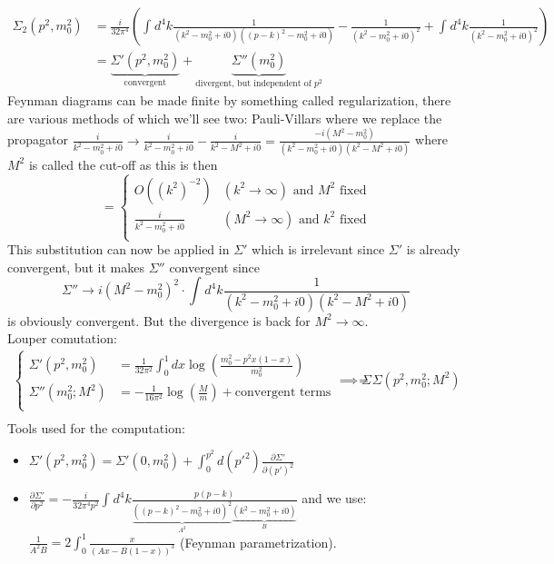 \documentclass{report}
\begin{document}
\begin{align*}
  \Sigma_2\left( p^2, m_0^2 \right) &= \frac{i}{32 \pi^{4}  } \left( \int_{}^{} d^{4}k \frac{1}{\left( k^2 - m_0^2 + i 0 \right) \left( \left( p-k \right) ^2 - m_0^2 + i 0 \right) } - \frac{1}{\left( k^2 - m_0^2 + i 0 \right)^2}   + \int_{}^{} d^{4}k \frac{1}{\left( k^2 - m_0^2 + i 0 \right) ^2} \right) \\
       &= \underbrace{ \Sigma'\left( p^2, m_0^2 \right) }_{\text{convergent}}  + \underbrace{\Sigma''\left( m_0^2 \right)}_{\text{divergent, but independent of } p^2} 
\end{align*}
Feynman diagrams can be made finite by something called regularization, there are various methods of which we'll see two: Pauli-Villars where we replace the propagator $\frac{i}{k^2 - m_0^2 + i 0} \to \frac{i}{k^2 - m_0^2 + i 0} - \frac{i}{k^2 - M^2 + i 0} = \frac{-i \left( M^2 - m_0^2 \right) }{\left( k^2 - m_0^2 + i 0  \right) \left( k^2 - M^2 + i 0 \right) } $ where $M^2$ is called the cut-off as this is then \[
= \begin{cases}
  O\left( \left( k^2 \right)^{-2}  \right)  & \left( k^2 \to \infty \right) \text{ and $M^2$ fixed} \\
  \frac{i}{k^2 - m_0^2 + i 0}  & \left( M^2 \to \infty \right) \text{ and $k^2$ fixed} \\
\end{cases}
\] 
This substitution can now be applied in $\Sigma'$ which is irrelevant since $\Sigma'$ is already convergent, but it makes $\Sigma''$ convergent since \[
\Sigma'' \to i \left( M^2 - m_0^2 \right) ^2 \cdot \int_{}^{} d^{4}k \frac{1}{\left( k^2 - m_0^2 + i 0 \right) \left( k^2 - M^2 + i 0 \right) }  
\] is obviously convergent. But the divergence is back for $M^2 \to \infty$.\\
Louper comutation:
\begin{align*}
  \begin{cases}
    \Sigma'\left( p^2,m_0^2 \right) &= \frac{1}{32 \pi^2} \int_{0}^{1} dx \log\left( \frac{m_0^2 - p^2x\left( 1-x \right) }{m_0^2}  \right)   \\
    \Sigma''\left( m_0^2; M^2 \right) &= -\frac{1}{16 \pi^2} \log\left( \frac{M}{m}  \right) + \text{convergent terms}  \\
  \end{cases}
  \implies \Sigma &= \Sigma\left( p^2, m_0^2; M^2 \right) \\
\end{align*}
Tools used for the computation:
\begin{itemize}
  \item $\Sigma'\left( p^2,m_0^2 \right) = \Sigma'\left( 0, m_0^2 \right) + \int_{0}^{p^2} d\left( p'^2 \right) \frac{\partial \Sigma'}{\partial \left( p' \right)^2}  $
  \item $\frac{\partial \Sigma'}{\partial p^2} = -\frac{i}{32 \pi^{4} p^2} \int_{}^{} d^{4}k \frac{p\left( p-k \right) }{\underbrace{\left( \left( p-k \right)^2 - m_0^2 + i 0  \right)^2}_{A^2} \underbrace{\left( k^2 - m_0^2 + i 0 \right)}_{B}  }  $ and we use: $\frac{1}{A^2 B} = 2 \int_{0}^{1} \frac{x}{\left( Ax - B\left( 1-x \right)  \right) ^3}  $ (Feynman parametrization).
\end{itemize}
\end{document}
